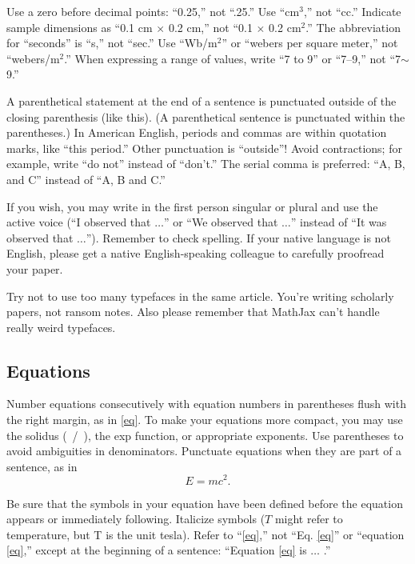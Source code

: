\documentclass{ieeeojies}
\begin{document}
Use a zero before decimal points: ``0.25,'' not ``.25.'' Use
``cm$^{3}$,'' not ``cc.'' Indicate sample dimensions as ``0.1 cm
$\times $ 0.2 cm,'' not ``0.1 $\times $ 0.2 cm$^{2}$.'' The
abbreviation for ``seconds'' is ``s,'' not ``sec.'' Use
``Wb/m$^{2}$'' or ``webers per square meter,'' not
``webers/m$^{2}$.'' When expressing a range of values, write ``7 to
9'' or ``7--9,'' not ``7$\sim $9.''

A parenthetical statement at the end of a sentence is punctuated outside of
the closing parenthesis (like this). (A parenthetical sentence is punctuated
within the parentheses.) In American English, periods and commas are within
quotation marks, like ``this period.'' Other punctuation is ``outside''!
Avoid contractions; for example, write ``do not'' instead of ``don't.'' The
serial comma is preferred: ``A, B, and C'' instead of ``A, B and C.''

If you wish, you may write in the first person singular or plural and use
the active voice (``I observed that $\ldots$'' or ``We observed that $\ldots$''
instead of ``It was observed that $\ldots$''). Remember to check spelling. If
your native language is not English, please get a native English-speaking
colleague to carefully proofread your paper.

Try not to use too many typefaces in the same article. You're writing
scholarly papers, not ransom notes. Also please remember that MathJax
can't handle really weird typefaces.

\subsection{Equations}
Number equations consecutively with equation numbers in parentheses flush
with the right margin, as in \eqref{eq}. To make your equations more
compact, you may use the solidus (~/~), the exp function, or appropriate
exponents. Use parentheses to avoid ambiguities in denominators. Punctuate
equations when they are part of a sentence, as in
\begin{equation}E=mc^2.\label{eq}\end{equation}

Be sure that the symbols in your equation have been defined before the
equation appears or immediately following. Italicize symbols ($T$ might refer
to temperature, but T is the unit tesla). Refer to ``\eqref{eq},'' not ``Eq. \eqref{eq}''
or ``equation \eqref{eq},'' except at the beginning of a sentence: ``Equation \eqref{eq}
is $\ldots$ .''
\end{document}
